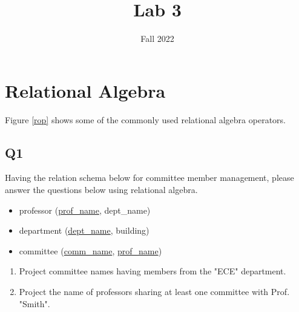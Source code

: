 \documentclass{homework}
\author{}
\date{Fall 2022}
\title{Lab 3}
\begin{document}
 \maketitle

\section{Relational Algebra}
Figure \ref{rop} shows some of the commonly used relational algebra operators.

\subsection*{Q1} Having the relation schema below for committee member management, please answer the questions below using relational algebra.
\begin{itemize}[label=]
    \item professor (\underline{prof\_name}, dept\_name)
    \item department (\underline{dept\_name}, building)
    \item committee (\underline{comm\_name}, \underline{prof\_name})
\end{itemize}

\begin{enumerate}[label=\alph*)]
    \item Project committee names having members from the "ECE" department.
    \item Project the name of professors sharing at least one committee with Prof. "Smith".
\end{enumerate}
\end{document}
